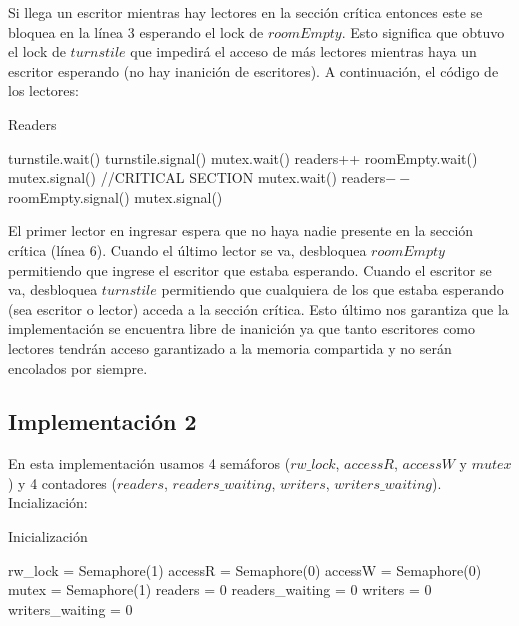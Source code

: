 Si llega un escritor mientras hay lectores en la sección crítica entonces este se bloquea en la línea 3 esperando el lock de $roomEmpty$. Esto significa que obtuvo el lock de $turnstile$ que impedirá el acceso de más lectores mientras haya un escritor esperando (no hay inanición de escritores). A continuación, el código de los lectores:

\begin{algorithm}[H]
\caption{Readers}\label{ej1}
\begin{algorithmic}[1]
	\State turnstile.wait()
	\State turnstile.signal()
	\State mutex.wait()
	\State readers++
		\State roomEmpty.wait()
	\EndIf
	\State mutex.signal()
	\State //CRITICAL SECTION
	\State mutex.wait()
	\State readers$--$
		\State roomEmpty.signal()
	\EndIf
	\State mutex.signal()
\EndProcedure
\end{algorithmic}
\end{algorithm}

El primer lector en ingresar espera que no haya nadie presente en la sección crítica (línea 6). Cuando el último lector se va, desbloquea $roomEmpty$ permitiendo que ingrese el escritor que estaba esperando. Cuando el escritor se va, desbloquea $turnstile$ permitiendo que cualquiera de los que estaba esperando (sea escritor o lector) acceda a la sección crítica. Esto último nos garantiza que la implementación se encuentra libre de inanición ya que tanto escritores como lectores tendrán acceso garantizado a la memoria compartida y no serán encolados por siempre.

\subsection{Implementación 2}

En esta implementación usamos 4 semáforos ($rw\_lock$, $accessR$, $accessW$ y $mutex$) y 4 contadores ($readers$, $readers\_waiting$, $writers$, $writers\_waiting$).
Incialización:

\begin{algorithm}[H]
\caption{Inicialización}\label{ej1}
\begin{algorithmic}[1]
	\State rw\_lock = Semaphore(1)
	\State accessR = Semaphore(0)
	\State accessW = Semaphore(0)
	\State mutex = Semaphore(1)
	\State readers = 0
	\State readers\_waiting = 0
	\State writers = 0
	\State writers\_waiting = 0
\EndProcedure
\end{algorithmic}
\end{algorithm}

